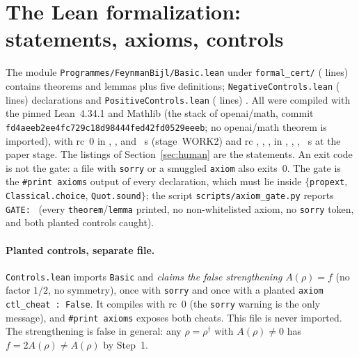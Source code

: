 \documentclass[11pt]{article}
\theoremstyle{remark}
\newcommand{\lean}[1]{\texttt{#1}}
\begin{document}
\section{The Lean formalization: statements, axioms, controls}\label{sec:lean}
The module \texttt{Programmes/FeynmanBijl/Basic.lean} under \texttt{formal\_cert/} (\PLLinesBasic{} lines) contains
\PLNBasic{} theorems and lemmas plus five definitions; \texttt{NegativeControls.lean} (\PLLinesNeg{} lines) \PLNNeg{} declarations and
\texttt{PositiveControls.lean} (\PLLinesPos{} lines) \PLNPos{}. All were compiled with the pinned Lean~4.34.1 and Mathlib (the stack of openai/math,
commit \texttt{fd4aeeb2ee4fc729c18d98444fed42fd0529eeeb}; no openai/math theorem is imported), with rc~0 in \PLSecBasic, \PLSecNeg, \PLSecPos{} and \PLSecCtl{}~s
(stage~WORK2) and rc \PLReRcBasic, \PLReRcNeg, \PLReRcPos, \PLReRcCtl{} in \PLReSecBasic, \PLReSecNeg, \PLReSecPos, \PLReSecCtl{}~s at the paper stage. The
listings of Section~\ref{sec:human} are the statements. An exit code is not the gate: a file with \lean{sorry} or a smuggled \lean{axiom} also exits~0. The gate is the
\lean{\#print axioms} output of every declaration, which must lie inside $\{$\lean{propext}, \lean{Classical.choice}, \lean{Quot.sound}$\}$; the script
\texttt{scripts/axiom\_gate.py} reports \texttt{GATE: \PLGate} (every \lean{theorem}/\lean{lemma} printed, no non-whitelisted axiom, no \lean{sorry} token, and both planted
controls caught).





\paragraph{Planted controls, separate file.} \texttt{Controls.lean} imports \lean{Basic} and \emph{claims the false strengthening} $A(\rho)=f$ (no factor $1/2$, no symmetry), once with
\lean{sorry} and once with a planted \lean{axiom ctl\_cheat : False}. It compiles with rc~0 (the \lean{sorry} warning is the only message), and \lean{\#print axioms}
exposes both cheats. This file is never imported. The strengthening is false in general: any $\rho=\rho^\dagger$ with $A(\rho)\ne0$ has $f=2A(\rho)\ne A(\rho)$ by Step~1.


\end{document}
